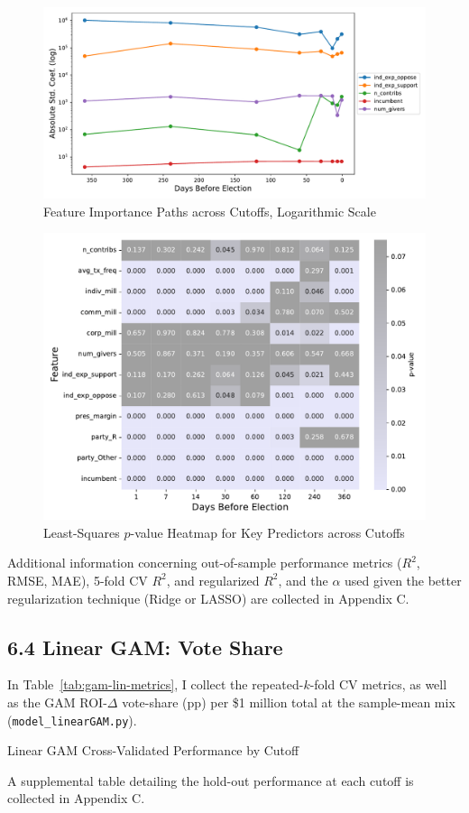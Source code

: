\begin{figure}[H]
	\centering
	\includegraphics[width = 0.8\linewidth]{../Figures/feat_imp.pdf}
	\caption{Feature Importance Paths across Cutoffs, Logarithmic Scale}
	\label{fig:feat-importance}
\end{figure}

\begin{figure}[H]
	\centering
	\includegraphics[width = 0.8\linewidth]{../Figures/sig_heatmap.pdf}
	\caption{Least-Squares $p$-value Heatmap for Key Predictors across Cutoffs}
	\label{fig:heatmap}
\end{figure}

Additional information concerning out-of-sample performance metrics ($R^2$, RMSE, MAE), 5-fold CV $R^2$, and regularized $R^2$, and the $\alpha$ used given the better regularization technique (Ridge or LASSO) are collected in Appendix C. 

\subsection*{6.4 Linear GAM: Vote Share}

In Table~\ref{tab:gam-lin-metrics}, I collect the repeated-$k$-fold CV metrics, as well as the GAM ROI-$\Delta$ vote-share (pp) per \$1 million total at the sample-mean mix (\texttt{model\_linearGAM.py}).

\begin{table}[H]
	\centering
	
	\caption{Linear GAM Cross-Validated Performance by Cutoff}
	\label{tab:gam-lin-metrics}
\end{table}

A supplemental table detailing the hold-out performance at each cutoff is collected in Appendix C.
